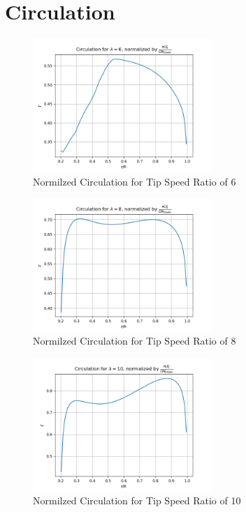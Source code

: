 \section{Circulation}
\begin{figure}[H]
    \centering
    \includegraphics[width=0.6\textwidth]{Figures/Circulation_6.png}
    \caption{Normilzed Circulation for Tip Speed Ratio of 6}
    \label{fig:normilzed circulation - lambda 6}
\end{figure}
\begin{figure}[H]
    \centering
    \includegraphics[width=0.6\textwidth]{Figures/Circulation_8.png}
    \caption{Normilzed Circulation for Tip Speed Ratio of 8}
    \label{fig:normilzed circulation - lambda 8}
\end{figure}
\begin{figure}[H]
    \centering
    \includegraphics[width=0.6\textwidth]{Figures/Circulation_10.png}
    \caption{Normilzed Circulation for Tip Speed Ratio of 10}
    \label{fig:normilzed circulation - lambda 10}
\end{figure}

